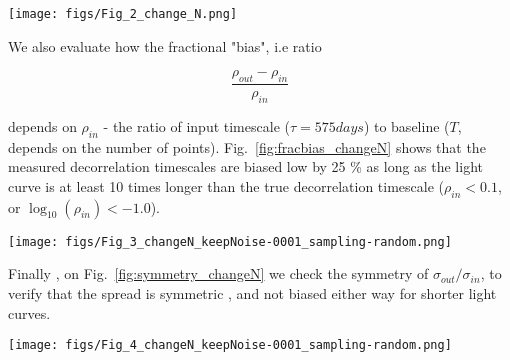 \documentclass[fleqn,usenatbib]{mnras}  %
\begin{document}
\begin{figure*}
\texttt{[image: figs/Fig\_2\_change\_N.png]}
\caption{Similarly to Fig.~\ref{fig:change_noise}, but keeping noise fixed at 0.001 mag level , random sampling , and decreasing from left to right the number of points from 1000 to 60. }
\label{fig:change_N}
\end{figure*} 

We also evaluate how the fractional "bias", i.e ratio 

\begin{equation}
\frac{\rho_{out}-\rho_{in}}{\rho_{in}}
\end{equation}

depends on $\rho_{in}$ -  the ratio of input timescale ($\tau=575 days$) to baseline ($T$, depends on the number of points).
Fig.~\ref{fig:fracbias_changeN} shows that the measured decorrelation timescales are biased low by 25 \%  as long as the light curve is at least 10 times longer than the true decorrelation timescale ($\rho_{in} < 0.1 $, or $\log_{10}(\rho_{in}) < -1.0$). 


\begin{figure*}
\texttt{[image: figs/Fig\_3\_changeN\_keepNoise-0001\_sampling-random.png]}
\caption{Histogram of the fractional bias of $\rho_{out}-\rho_{in} / \rho_{in}$, as a function of the input $\rho$ (=575 / N). From left to right we change N from 1000 to 60 which sets the maximum value of $\rho_{in}$. We fix photometric noise at 0.001 mag level and select random sampling. Overplotted is the median fractional bias (orange dots), the unbiased level (horizontal dotted line), and the value of $\rho_{in} = 0.1$ (vertical solid line). Note that regardless of the number of points sampling the lightcurve, the bias is less than 25\%  as long as  the length of light curve is at least ten times longer than the true decorrelation timescale ($\tau = 575 $days ).}
\label{fig:fracbias_changeN}
\end{figure*} 

Finally , on Fig.~\ref{fig:symmetry_changeN} we check the symmetry of $\sigma_{out} / \sigma_{in}$, to verify that the spread is symmetric , and not biased either way for shorter light curves. 


\begin{figure*}
\texttt{[image: figs/Fig\_4\_changeN\_keepNoise-0001\_sampling-random.png]}
\caption{Histogram of the 'measured' $\sigma_{out}$ to 'true' $\sigma_{in}$. As in Fig.~\ref{fig:fracbias_changeN}, we change the N points from left to right, keeping the sampling type (random) and photometric error (0.001 mag) unchanged. The orange circles mark the median y. We also overplot the horizontal dotted line at y=0, and vertical solid line at x=-1.0.}
\label{fig:symmetry_changeN}
\end{figure*} 
\end{document}
